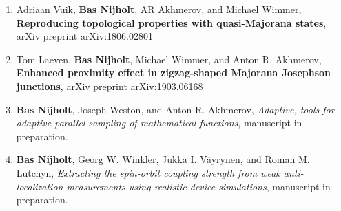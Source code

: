 \begin{enumerate}
\item Adriaan Vuik, \textbf{Bas Nijholt}, AR Akhmerov, and Michael Wimmer, \textbf{Reproducing topological properties with quasi-Majorana states}, \href{}{arXiv preprint arXiv:1806.02801}

\item Tom Laeven, \textbf{Bas Nijholt}, Michael Wimmer, and Anton R. Akhmerov, \textbf{Enhanced proximity effect in zigzag-shaped Majorana Josephson junctions}, \href{}{arXiv preprint arXiv:1903.06168}

\item \textbf{Bas Nijholt}, Joseph Weston, and Anton R. Akhmerov, \textit{Adaptive, tools for adaptive parallel sampling of mathematical functions}, manuscript in preparation.

\item \textbf{Bas Nijholt}, Georg W. Winkler, Jukka I. V{\"a}yrynen, and Roman M. Lutchyn, \textit{Extracting the spin-orbit coupling strength from weak anti-localization measurements using realistic device simulations}, manuscript in preparation.

\end{enumerate}


